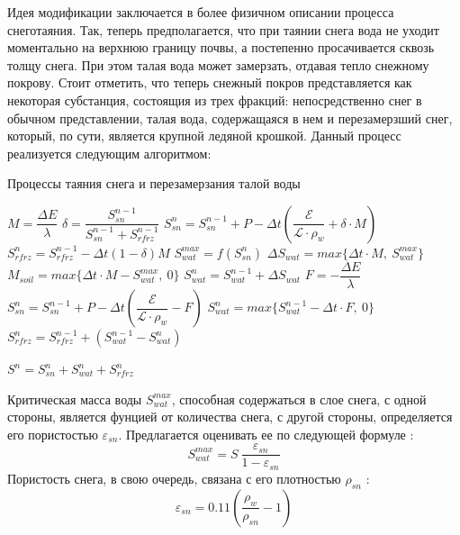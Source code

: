 \documentclass[a4paper, fontsize=14pt]{scrartcl}
\begin{document}
Идея модификации заключается в более физичном описании процесса снеготаяния. Так, теперь предполагается, что при таянии снега вода не уходит моментально на верхнюю границу почвы, а постепенно просачивается сквозь толщу снега. При этом талая вода может замерзать, отдавая тепло снежному покрову. Стоит отметить, что теперь снежный покров представляется как некоторая субстанция, состоящия из трех фракций: непосредственно снег в обычном представлении, талая вода, содержащаяся в нем и перезамерзший снег, который, по сути, является крупной ледяной крошкой. Данный процесс реализуется следующим алгоритмом:

\begin{algorithm}[H]
\caption{Процессы таяния снега и перезамерзания талой воды}
\label{alg:setup}
\begin{algorithmic}[]
        \State $ M = \dfrac{\Delta E}{\lambda} $ 
        \State $ \delta = \dfrac{S_{sn}^{n-1}}{S_{sn}^{n-1} + S_{rfrz}^{n - 1}}$ 
        \State $ S_{sn}^n = S_{sn}^{n-1} + P - \Delta t \left( \dfrac{\mathcal{E}}{\mathcal{L} \cdot \rho_w} + \delta \cdot M \right) $ 
        \State $ S_{rfrz}^n = S_{rfrz}^{n - 1} - \Delta t (1 - \delta)M $ 
        \State $ S_{wat}^{max} = f( S_{sn}^n ) $
        \State $ \Delta S_{wat} = max\{\Delta t \cdot M, ~S_{wat}^{max}\} $ 
        \State $ M_{soil} = max\{\Delta t \cdot M - S_{wat}^{max}, ~0\} $ 
        \State $ S_{wat}^n = S_{wat}^{n-1} + \Delta S_{wat} $ 
    \Else
            \State $F = -\dfrac{\Delta E}{\lambda}$
            \State $S_{sn}^n = S_{sn}^{n-1} + P - \Delta t \left( \dfrac{\mathcal{E}}{\mathcal{L} \cdot \rho_w} - F \right)$
            \State $S_{wat}^n = max\{ S_{wat}^{n-1} - \Delta t \cdot F, ~0\}$
            \State $S_{rfrz}^n = S_{rfrz}^{n - 1} + ( S_{wat}^{n-1} - S_{wat}^n )$
            
        \EndIf
    \EndIf
    \State $S^n = S_{sn}^n + S_{wat}^n + S_{rfrz}^n$
\end{algorithmic}
\end{algorithm}

Критическая масса воды $S_{wat}^{max}$, способная содержаться в слое снега, с одной стороны, является фунцией от количества снега, с другой стороны, определяется его пористостью $\varepsilon_{sn}$. Предлагается оценивать ее по следующей формуле \cite{Gusev2002}:
\begin{equation}
     S_{wat}^{max} = S ~\dfrac{\varepsilon_{sn}}{1 - \varepsilon_{sn}}  \label{sys}  
\end{equation}
Пористость снега, в свою очередь, связана с его плотностью $\rho_{sn}$ \cite{Stock}:
\begin{equation}
    \varepsilon_{sn} = 0.11 \left( \dfrac{\rho_w}{\rho_{sn}} - 1 \right)  \label{sys}  
\end{equation}
\end{document}
